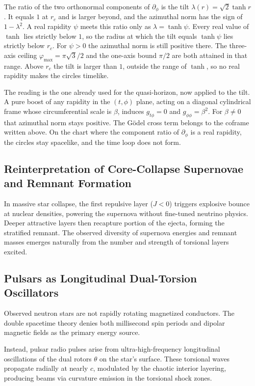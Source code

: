 \documentclass[a4paper]{article}
\begin{document}
The ratio of the two orthonormal components of $\partial_\phi$ is the tilt $\lambda(r)=\sqrt{2}\tanh r$. It equals $1$ at $r_c$ and is larger beyond, and the azimuthal norm has the sign of $1-\lambda^2$. A real rapidity $\psi$ meets this ratio only as $\lambda=\tanh\psi$. Every real value of $\tanh$ lies strictly below $1$, so the radius at which the tilt equals $\tanh\psi$ lies strictly below $r_c$. For $\psi>0$ the azimuthal norm is still positive there. The three-axis ceiling $\varphi_{\max}=\pi\sqrt{3}/2$ and the one-axis bound $\pi/2$ are both attained in that range. Above $r_c$ the tilt is larger than $1$, outside the range of $\tanh$, so no real rapidity makes the circles timelike.

The reading is the one already used for the quasi-horizon, now applied to the tilt. A pure boost of any rapidity in the $(t,\phi)$ plane, acting on a diagonal cylindrical frame whose circumferential scale is $\beta$, induces $g_{t\phi}=0$ and $g_{\phi\phi}=\beta^2$. For $\beta\neq 0$ that azimuthal norm stays positive. The Gödel cross term belongs to the coframe written above. On the chart where the component ratio of $\partial_\phi$ is a real rapidity, the circles stay spacelike, and the time loop does not form.

\subsection{Reinterpretation of Core-Collapse Supernovae and Remnant Formation}

In massive star collapse, the first repulsive layer ($J < 0$) triggers explosive bounce at nuclear densities, powering the supernova without fine-tuned neutrino physics. Deeper attractive layers then recapture portion of the ejecta, forming the stratified remnant. The observed diversity of supernova energies and remnant masses emerges naturally from the number and strength of torsional layers excited.

\subsection{Pulsars as Longitudinal Dual-Torsion Oscillators}

Observed neutron stars are not rapidly rotating magnetized conductors. The double spacetime theory denies both millisecond spin periods and dipolar magnetic fields as the primary energy source.

Instead, pulsar radio pulses arise from ultra-high-frequency longitudinal oscillations of the dual rotors $\theta$ on the star's surface. These torsional waves propagate radially at nearly $c$, modulated by the chaotic interior layering, producing beams via curvature emission in the torsional shock zones.
\end{document}
